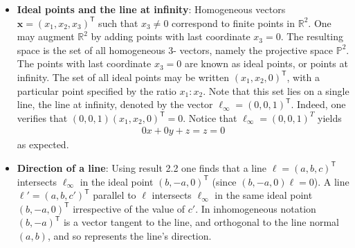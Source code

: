 \documentclass{report}
\begin{document}
\begin{itemize}
            \bigbreak \noindent 
            Consider the two lines $x=1$ and $x=2$. Here the two lines are parallel, and consequently intersect "at infinity". In homogeneous notation the lines are $\mathbf{\ell}=(-1, 0, 1)^{\mathsf{T}}$, $\ell'=(-1, 0, 2)^{\mathsf{T}}$, and from result 2.2 their intersection point is
            \begin{align*}
                \mathbf{x} = \mathbf{\mathbf{\ell}} \times \mathbf{\ell}^{\prime} = \begin{vmatrix} \mathbf{i} & \mathbf{j} & \mathbf{k} \\ -1 & 0 & 1 \\ -1 & 0 & 2\end{vmatrix} = \begin{pmatrix} 0 \\ 1 \\ 0 \end{pmatrix}
            \end{align*}
            which is the point at infinity in the direction of the $y$-axis.
        \item \textbf{Ideal points and the line at infinity}: Homogeneous vectors $\mathbf{x}=(x_{1}, x_{2}, x_{3})^{\mathsf{T}}$ such that $x_{3}\ne 0$ correspond to finite points in $\mathbb{R}^{2}$. One may augment $\mathbb{R}^{2}$ by adding points with last coordinate $x_{3}=0$. The resulting space is the set of all homogeneous 3- vectors, namely the projective space $\mathbb{P}^{2}$. The points with last coordinate $x_{3}=0$ are known as ideal points, or points at infinity. The set of all ideal points may be written $(x_{1}, x_{2}, 0)^{\mathsf{T}}$, with a particular point specified by the ratio $x_{1}:x_{2}$. Note that this set lies on a single line, the line at infinity, denoted by the vector $\mathbf{\ell}_{\infty }=(0, 0, 1)^{\mathsf{T}}$. Indeed, one verifies that $(0, 0, 1)(x_{1}, x_{2}, 0)^{\mathsf{T}}=0$.
            \bigbreak \noindent 
            Notice that $\mathbf{\ell}_{\infty} = (0,0,1)^{T}$ yields
            \begin{align*}
               0x + 0y + z = z = 0 
            \end{align*}
            as expected.
        \item \textbf{Direction of a line}: Using result 2.2 one finds that a line $\mathbf{\mathbf{\ell}}=(a, b, c)^{\mathsf{T}}$ intersects $\mathbf{\ell}_{\infty }$ in the ideal point $(b, -a, 0)^{\mathsf{T}}$ (since $(b, -a, 0)\mathbf{\ell}=0$). A line $\mathbf{\ell}'=(a, b, c')^{\mathsf{T}}$ parallel to $\ell$ intersects $\mathbf{\ell}_{\infty }$ in the same ideal point $(b, -a, 0)^{\mathsf{T}}$ irrespective of the value of $c'$. In inhomogeneous notation $(b, -a)^{\mathsf{T}}$ is a vector tangent to the line, and orthogonal to the line normal $(a, b)$, and so represents the line’s direction.

\end{itemize}
\end{document}
